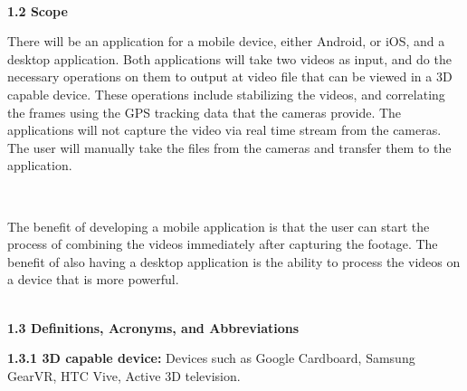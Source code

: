 \documentclass[10pt,draftclsnofoot,onecolumn]{IEEEtran}
\begin{document}
\\
\vspace{5mm}
{\Medium\textbf{1.2 Scope}}\\
\vspace{5mm}

There will be an application for a mobile device, either Android, or iOS, and a desktop application. Both applications will take two videos as input, and do the necessary operations on them to output at video file that can be viewed in a 3D capable device. These operations include stabilizing the videos, and correlating the frames using the GPS tracking data that the cameras provide. The applications will not capture the video via real time stream from the cameras. The user will manually take the files from the cameras and transfer them to the application. 

 \\
\vspace{5mm}

The benefit of developing a mobile application is that the user can start the process of combining the videos immediately after capturing the footage. The benefit of also having a desktop application is the ability to process the videos on a device that is more powerful. \\
 
 \\ 
\vspace{5mm}

{\Medium\textbf{1.3 Definitions, Acronyms, and Abbreviations}}\\
\vspace{5mm}

\textbf{1.3.1 3D capable device:}   Devices such as Google Cardboard, Samsung GearVR, HTC Vive,  Active 3D television.
 \vspace{5mm}
\end{document}
